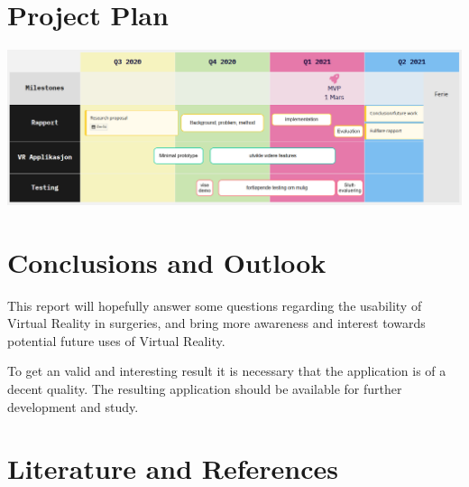 \documentclass[11pt]{scrartcl}
\begin{document}
\section{Project Plan}

\includegraphics[width=\textwidth]{timeline.png}

\section{Conclusions and Outlook}

This report will hopefully answer some questions regarding the usability of Virtual Reality in
surgeries, and bring more awareness and interest towards potential future uses
of Virtual Reality. 

To get an valid and interesting result it is necessary that the application is of a
decent quality. The resulting application should be available for further
development and study.


\section{Literature and References}


\printbibliography
\end{document}
